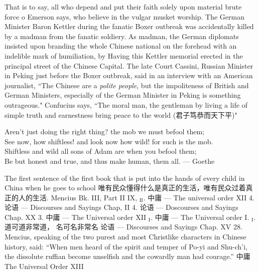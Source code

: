 \begin{thebibliography}{30}
     That is to say, all who depend and put their faith solely upon material brute force o Emerson says, who believe in the vulgar musket worship.
     The German Minister Baron Kettler during the fanatic Boxer outbreak was accidentally killed by a madman from the fanatic soldiery. As madman, the German diplomats insisted upon branding the whole Chinese national on the forehead with an indelible mark of humiliation, by Having this Kettler memorial erected in the principal street of the Chinese Capital. The late Court Cassini, Russian Minister in Peking just before the Boxer outbreak, said in an interview with an American journalist, ``The Chinese are a \emph{polite people}, but the impoliteness of British and German Ministers, especially of the German Minister in Peking is something outrageous."
     Confucius says, ``The moral man, the gentleman by living a life of simple truth and earnestness bring peace to the world (君子笃恭而天下平)" 
     \begin{center}
    Aren't just doing the right thing? \hfill the mob we must befool them;\\
    See now, how shiftless! and look now how wild! for such is the mob.\\
    Shiftless and wild all sons of Adam are when you befool them;\\
    Be but honest and true, and thus make human, them all. \hfill --- Goethe\\
\end{center} 
     The first sentence of the first book that is put into the hands of every child in China when he goes to school
     唯有民众懂得什么是真正的生活，唯有民众过着真正的人的生活.
     Mencius Bk. III, Part II IX, $_{\text{II}}$.
     中庸 --- The universal order XII 4.
     论语 --- Discourses and Sayings Chap, II 4.
     论语 --- Doscourses and Sayings Chap. XX 3.
     中庸 --- The Universal order XII $_{\text{I}}$.
     中庸 --- The Universal order I. $_\text{I}$.
     道可道非常道， 名可名非常名
     论语 --- Discourses and Sayings Chap. XV 28.
     Mencius, speaking of the two purest and most Christlike characters in Chinese history, said: ``When men heard of the spirit and temper of Po-yi and Shu-ch'i, the dissolute ruffian become unselfish and the cowardly man had courage.''
     中庸 The Universal Order XIII

\end{thebibliography}
